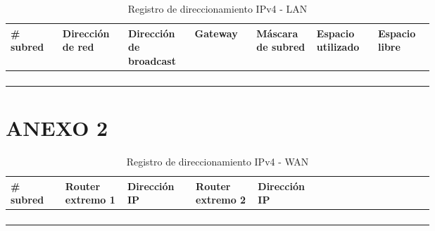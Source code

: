 \documentclass[12pt]{article}
\begin{document}
\begin{table}[ht]
\centering
\caption{Registro de direccionamiento IPv4 -  LAN}
\begin{tabular}{|p{0.10\linewidth}|p{0.10\linewidth}|p{0.10\linewidth}|p{0.10\linewidth}|p{0.10\linewidth}|p{0.10\linewidth}|p{0.10\linewidth}|}
\hline
\rowcolor[HTML]{C0C0C0} 
\# subred & Dirección de red & Dirección de broadcast & Gateway & Máscara de subred & Espacio utilizado & Espacio libre            \\ \hline
          &                  &                        &         &                    &                   & \\ \hline
          &                  &                        &         &                    &                   & \\ \hline
          &                  &                        &         &                    &                   & \\ \hline
          &                  &                        &         &                    &                   & \\ \hline
\end{tabular}
\end{table}

\section{ANEXO 2}

\begin{table}[ht]
\centering
\caption{Registro de direccionamiento IPv4 - WAN}
\begin{tabular}{|p{0.10\linewidth}|p{0.10\linewidth}|p{0.10\linewidth}|p{0.10\linewidth}|p{0.10\linewidth}|p{0.10\linewidth}|p{0.10\linewidth}|}
\hline
\rowcolor[HTML]{C0C0C0} 
\# subred & Router extremo 1 & Dirección IP & Router extremo 2 & Dirección IP\\ \hline
          &                  &                        &         &                     \\ \hline
          &                  &                        &         &                     \\ \hline
          &                  &                        &         &                    \\ \hline
          &                  &                        &         &                    \\ \hline
\end{tabular}
\end{table}
\end{document}
